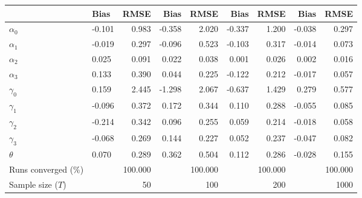 
\begin{tabular}[t]{llrrrrrrr}
\toprule
  & Bias & RMSE & Bias & RMSE & Bias & RMSE & Bias & RMSE\\
\midrule
$\alpha_{0}$ & -0.101 & 0.983 & -0.358 & 2.020 & -0.337 & 1.200 & -0.038 & 0.297\\
$\alpha_{1}$ & -0.019 & 0.297 & -0.096 & 0.523 & -0.103 & 0.317 & -0.014 & 0.073\\
$\alpha_{2}$ & 0.025 & 0.091 & 0.022 & 0.038 & 0.001 & 0.026 & 0.002 & 0.016\\
$\alpha_{3}$ & 0.133 & 0.390 & 0.044 & 0.225 & -0.122 & 0.212 & -0.017 & 0.057\\
$\gamma_{0}$ & 0.159 & 2.445 & -1.298 & 2.067 & -0.637 & 1.429 & 0.279 & 0.577\\
$\gamma_{1}$ & -0.096 & 0.372 & 0.172 & 0.344 & 0.110 & 0.288 & -0.055 & 0.085\\
$\gamma_{2}$ & -0.214 & 0.342 & 0.096 & 0.255 & 0.059 & 0.214 & -0.018 & 0.058\\
$\gamma_{3}$ & -0.068 & 0.269 & 0.144 & 0.227 & 0.052 & 0.237 & -0.047 & 0.082\\
$\theta$ & 0.070 & 0.289 & 0.362 & 0.504 & 0.112 & 0.286 & -0.028 & 0.155\\
Runs converged (\%) &  & 100.000 &  & 100.000 &  & 100.000 &  & 100.000\\
Sample size ($T$) &  & 50 &  & 100 &  & 200 &  & 1000\\
\bottomrule
\end{tabular}
